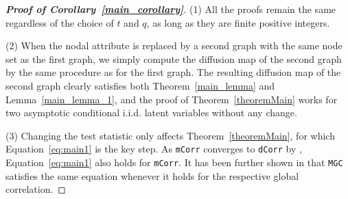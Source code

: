 \documentclass[11pt]{article}
\theoremstyle{definition}
\begin{document}
\begin{proof}[\textbf{Proof of Corollary~\ref{main_corollary}}] 
(1) All the proofs remain the same regardless of the choice of $t$ and $q$, as long as they are finite positive integers.

(2) When the nodal attribute is replaced by a second graph with the same node set as the first graph, we simply compute the diffusion map of the second graph by the same procedure as for the first graph. The resulting diffusion map of the second graph clearly satisfies both Theorem~\ref{main_lemma} and Lemma~\ref{main_lemma_1}, and the proof of Theorem~\ref{theoremMain} works for two asymptotic conditional i.i.d. latent variables without any change.

(3) Changing the test statistic only affects Theorem~\ref{theoremMain}, for which Equation~\ref{eq:main1} is the key step. As \texttt{mCorr} converges to \texttt{dCorr} by \cite{szekely2013distance}, Equation~\ref{eq:main1} also holds for \texttt{mCorr}. It has been further shown in \cite{shen2016discovering} that \texttt{MGC} satisfies the same equation whenever it holds for the respective global correlation. 
\end{proof}
\end{document}

